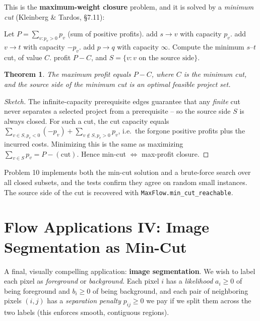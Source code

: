 \documentclass[11pt]{article}
\newtheorem{theorem}{Theorem}[section]
\begin{document}
This is the \textbf{maximum-weight closure} problem, and it is solved by a
\emph{minimum cut} (Kleinberg \& Tardos, \S 7.11):

\begin{algorithm}[h]
\caption{Project Selection via Min-Cut}
\begin{algorithmic}[1]
\State Let $P = \sum_{v : p_v > 0} p_v$ (sum of positive profits).
 add $s \to v$ with capacity $p_v$.
\EndFor
{} add $v \to t$ with capacity $-p_v$.
\EndFor
{} add $p \to q$ with capacity $\infty$.
\EndFor
\State Compute the minimum $s$--$t$ cut, of value $C$.
\State \Return profit $P - C$, and $S = \{v : v \text{ on the source side}\}$.
\end{algorithmic}
\end{algorithm}

\begin{theorem}
\label{thm:closure}
The maximum profit equals $P - C$, where $C$ is the minimum cut, and the
source side of the minimum cut is an optimal feasible project set.
\end{theorem}

\begin{proof}[Sketch]
The infinite-capacity prerequisite edges guarantee that any \emph{finite} cut
never separates a selected project from a prerequisite -- so the source side
$S$ is always closed. For such a cut, the cut capacity equals
$\sum_{v \in S, p_v < 0}(-p_v) + \sum_{v \notin S, p_v > 0} p_v$, i.e.\ the
forgone positive profits plus the incurred costs. Minimizing this is the same as
maximizing $\sum_{v \in S} p_v = P - (\text{cut})$. Hence min-cut $\Leftrightarrow$
max-profit closure.
\end{proof}

Problem 10 implements both the min-cut solution and a brute-force search over all
closed subsets, and the tests confirm they agree on random small instances. The
source side of the cut is recovered with \texttt{MaxFlow.min\_cut\_reachable}.

\section{Flow Applications IV: Image Segmentation as Min-Cut}

A final, visually compelling application: \textbf{image segmentation}. We wish to
label each pixel as \emph{foreground} or \emph{background}. Each pixel $i$ has a
\emph{likelihood} $a_i \ge 0$ of being foreground and $b_i \ge 0$ of being
background, and each pair of neighboring pixels $(i,j)$ has a
\emph{separation penalty} $p_{ij} \ge 0$ we pay if we split them across the two
labels (this enforces smooth, contiguous regions).
\end{document}
